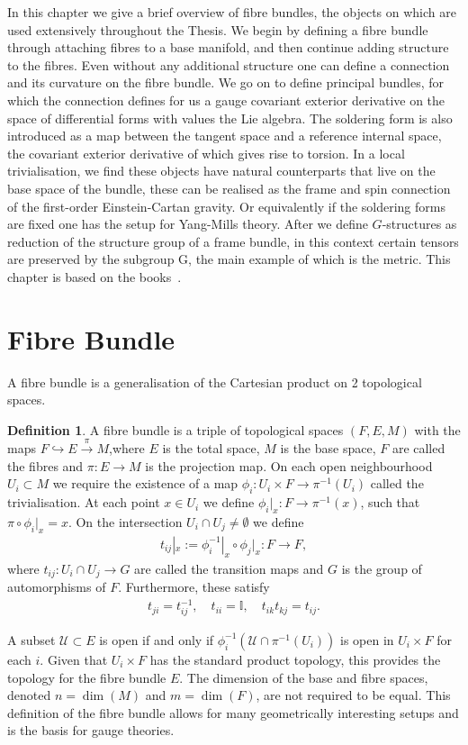 \documentclass[10pt]{report}
\theoremstyle{definition}
\newtheorem{definition}{Definition}[chapter]
\newcommand{\id}{\mathbb{I}}
\begin{document}
In this chapter we give a brief overview of fibre bundles, the objects on which are used extensively throughout the Thesis. We begin by defining a fibre bundle through attaching fibres to a base manifold, and then continue adding structure to the fibres. Even without any additional structure one can define a connection and its curvature on the fibre bundle. We go on to define principal bundles, for which the connection defines for us a gauge covariant exterior derivative on the space of differential forms with values the Lie algebra. The soldering form is also introduced as a map between the tangent space and a reference internal space, the covariant exterior derivative of which gives rise to torsion. In a local trivialisation, we find these objects have natural counterparts that live on the base space of the bundle, these can be realised as the frame and spin connection of the first-order Einstein-Cartan gravity. Or equivalently if the soldering forms are fixed one has the setup for Yang-Mills theory. After we define $G$-structures as reduction of the structure group of a frame bundle, in this context certain tensors are preserved by the subgroup G, the main example of which is the metric. This chapter is based on the books~\cite{Kobayashi1996-ho,Krasnov2020-qr}.

\section{Fibre Bundle}
A fibre bundle is a generalisation of the Cartesian product on 2 topological spaces. 
\begin{definition}\label{def:fibre-bundle}
    A fibre bundle is a triple of topological spaces $(F,E,M)$ with the maps $F \hookrightarrow E \overset{\pi}{\rightarrow} M$,where $E$ is the total space, $M$ is the base space, $F$ are called the fibres and $\pi : E \rightarrow M$ is the projection map. On each open neighbourhood $U_i \subset M$ we require the existence of a map $\phi_i : U_i \times F \rightarrow \pi^{-1}(U_i)$ called the trivialisation. At each point $x \in U_i$ we define $\phi_i|_x : F \rightarrow \pi^{-1}(x)$, such that $\pi \circ \phi_i|_x = x$. On the intersection $U_i \cap U_j \neq \emptyset$ we define
    \begin{align*}
        t_{ij}|_x := \phi_i^{-1}|_x \circ \phi_j|_x : F \rightarrow F,
    \end{align*}
    where $t_{ij} : U_i \cap U_j \rightarrow G$ are called the transition maps and $G$ is the group of automorphisms of $F$. Furthermore, these satisfy
    \begin{align*}
        t_{ji} = t_{ij}^{-1}, \quad t_{ii} = \id, \quad t_{ik} t_{kj} = t_{ij}.
    \end{align*}
\end{definition}
A subset $\mathcal{U} \subset E$ is open if and only if $\phi_i^{-1}(\mathcal{U} \cap \pi^{-1}(U_i))$ is open in $U_i \times F$ for each $i$. Given that $U_i \times F$ has the standard product topology, this provides the topology for the fibre bundle $E$. The dimension of the base and fibre spaces, denoted $n = \dim(M)$ and $m = \dim(F)$, are not required to be equal. This definition of the fibre bundle allows for many geometrically interesting setups and is the basis for gauge theories. 
\end{document}
